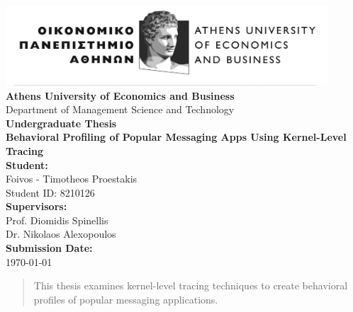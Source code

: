 \documentclass[a4paper,12pt]{report}
\begin{document}
\begin{titlepage}
    \begin{center}
        \vspace*{1.5cm}

        \includegraphics[width=0.9\textwidth]{./aueb_logo.png}\\[1cm]

        {\Large \textbf{Athens University of Economics and Business}}\\[0.5cm]
        {\large Department of Management Science and Technology}\\[1.5cm]

        {\Huge \textbf{Undergraduate Thesis}}\\[1.2cm]
        {\Large \textbf{Behavioral Profiling of Popular Messaging Apps Using Kernel-Level Tracing}}\\[2cm]

        \textbf{Student:}\\
        Foivos - Timotheos Proestakis\\
        Student ID: 8210126\\[1.5cm]

        \textbf{Supervisors:}\\
        Prof. Diomidis Spinellis \\
        Dr. Nikolaos Alexopoulos\\[1.5cm]

        \vfill
        \textbf{Submission Date:}\\
        \today
        \vspace*{1cm}
    \end{center}
\end{titlepage}
\clearpage


\begin{abstract}
This thesis examines kernel-level tracing techniques to create behavioral profiles of popular messaging applications.
\end{abstract}
\clearpage
\end{document}
